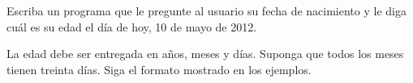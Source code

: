 Escriba un programa que le pregunte al usuario su fecha de nacimiento
y le diga cuál es su edad el día de hoy, 10 de mayo de 2012.

La edad debe ser entregada en años, meses y días.
Suponga que todos los meses tienen treinta días.
Siga el formato mostrado en los ejemplos.

\begin{minipage}[t]{.48\textwidth}
  
\end{minipage}
\hfill
\begin{minipage}[t]{.48\textwidth}
  
\end{minipage}

\begin{minipage}[t]{.48\textwidth}
  
\end{minipage}
\hfill
\begin{minipage}[t]{.48\textwidth}
  
\end{minipage}


